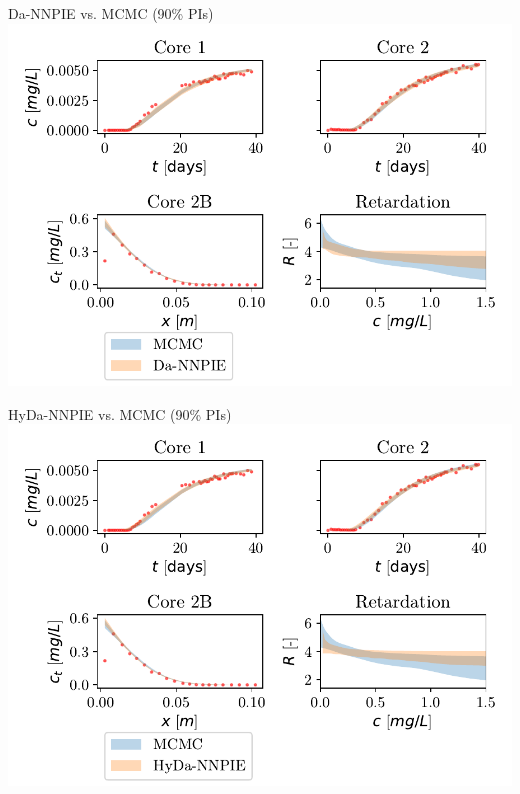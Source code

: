 \documentclass[aspectratio=1610]{beamer}
\begin{document}
\begin{frame}{Da-NNPIE vs. MCMC (90\% PIs)}
\centering
\includegraphics[height=0.9\textheight]{figs/finn_MCMCvsData-SPAN_PIs.pdf}
\end{frame}

\begin{frame}{HyDa-NNPIE vs. MCMC (90\% PIs)}
\centering
\includegraphics[height=0.9\textheight]{figs/finn_MCMCvsFull-SPAN_PIs.pdf}
\end{frame}
\end{document}
